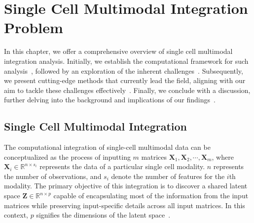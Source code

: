 %
%
\chapter{Single Cell Multimodal Integration Problem}
\label{chapter:problem_inte}
\graphicspath{{chapter3/figs/}}


In this chapter, we offer a comprehensive overview of single cell multimodal integration analysis. Initially, we establish the computational framework for such analysis~, followed by an exploration of the inherent challenges~. Subsequently, we present cutting-edge methods that currently lead the field, aligning with our aim to tackle these challenges effectively~. Finally, we conclude with a discussion, further delving into the background and implications of our findings~.




\section{Single Cell Multimodal Integration}
\label{bgInte:introduction}
The computational integration of single-cell multimodal data can be conceptualized as the process of inputting $m$ matrices $\mathbf{X}_1, \mathbf{X}_2,\cdots, \mathbf{X}_m$, where $\mathbf{X}_i\in \mathbb{R}^{n\times s_i}$ represents the data of a particular single cell modality. $n$ represents the number of observations, and $s_i$ denote the number of features for the $i$th modality. The primary objective of this integration is to discover a shared latent space $\mathbf{Z}\in\mathbb{R}^{n\times p}$ capable of encapsulating most of the information from the input matrices while preserving input-specific details across all input matrices. In this context, $p$ signifies the dimensions of the latent space~.

